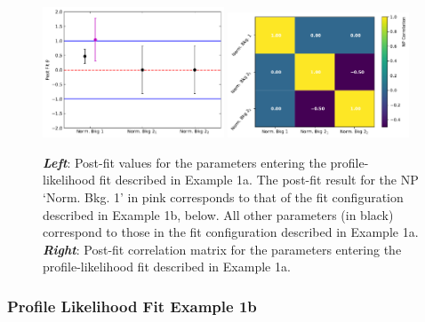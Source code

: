 \begin{figure}[!htb]
    \begin{center}
        \includegraphics[width=0.48\textwidth]{figures/common_ana/stat_hypo/profile_examples/profile_ex_1_pulls}
        \includegraphics[width=0.48\textwidth]{figures/common_ana/stat_hypo/profile_examples/np_corr_ex_1}
        \caption{
            \textbf{\textit{Left}}: Post-fit values for the parameters entering the profile-likelihood fit
                described in Example 1a. The post-fit result for the NP `Norm. Bkg. 1' in pink corresponds
                to that of the fit configuration described in Example 1b, below.
                All other parameters (in black) correspond to those in the fit configuration described in Example 1a.
            \textbf{\textit{Right}}: Post-fit correlation matrix for the parameters entering the profile-likelihood
                fit described in Example 1a.
        }
        \label{fig:prof_ex_1_pulls}
    \end{center}
\end{figure}

\subsubsection{Profile Likelihood Fit Example 1b}
\label{sec:profiling_example_1b}

